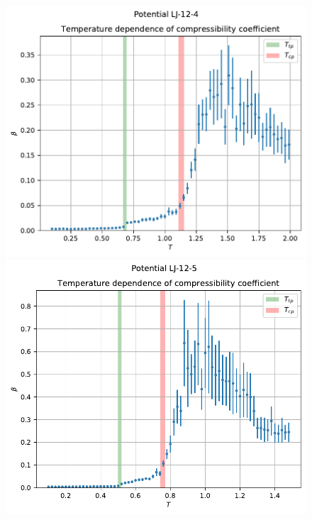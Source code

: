 \documentclass[pdf,hyperref={unicode}]{beamer}
\begin{document}
\begin{frame}
\transdissolve[duration=0.2]

\begin{figure}[h]
\begin{center}
\begin{minipage}[h]{0.35\linewidth}
\includegraphics[width=\textwidth, keepaspectratio]{plot_compress_Potential LJ-12-4_1}
\end{minipage}
\begin{minipage}[h]{0.35\linewidth}
\includegraphics[width=\textwidth, keepaspectratio]{plot_compress_Potential LJ-12-5_1}
\end{minipage}


\end{center}
\end{figure}
\end{frame}
\end{document}
